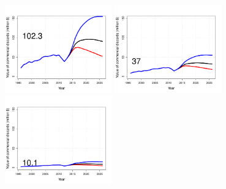 \begin{figure}[htbp]
	\centering
		\includegraphics[height=1.5in]{../FIGURES/SIZELIMIT/fig_32_DI_DVal.pdf}
		\includegraphics[height=1.5in]{../FIGURES/SIZELIMIT/fig_29_DI_DVal.pdf}
		\includegraphics[height=1.5in]{../FIGURES/SIZELIMIT/fig_26_DI_DVal.pdf}
		                                                              

\end{figure}
